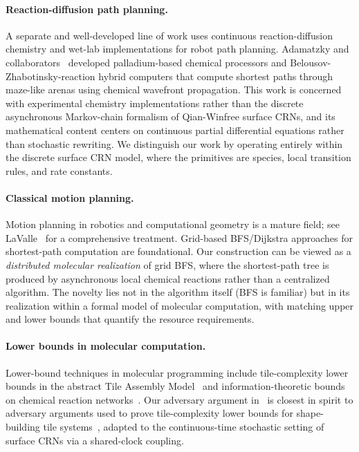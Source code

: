 \documentclass[11pt]{article}
\theoremstyle{plain}
\theoremstyle{definition}
\theoremstyle{remark}
\begin{document}
\paragraph{Reaction-diffusion path planning.} A separate and well-developed line of work uses continuous reaction-diffusion chemistry and wet-lab implementations for robot path planning. Adamatzky and collaborators~\cite{adamatzky2003,adamatzky2005} developed palladium-based chemical processors and Belousov-Zhabotinsky-reaction hybrid computers that compute shortest paths through maze-like arenas using chemical wavefront propagation. This work is concerned with experimental chemistry implementations rather than the discrete asynchronous Markov-chain formalism of Qian-Winfree surface CRNs, and its mathematical content centers on continuous partial differential equations rather than stochastic rewriting. We distinguish our work by operating entirely within the discrete surface CRN model, where the primitives are species, local transition rules, and rate constants.

\paragraph{Classical motion planning.} Motion planning in robotics and computational geometry is a mature field; see LaValle~\cite{lavalle2006} for a comprehensive treatment. Grid-based BFS/Dijkstra approaches for shortest-path computation are foundational. Our construction can be viewed as a \emph{distributed molecular realization} of grid BFS, where the shortest-path tree is produced by asynchronous local chemical reactions rather than a centralized algorithm. The novelty lies not in the algorithm itself (BFS is familiar) but in its realization within a formal model of molecular computation, with matching upper and lower bounds that quantify the resource requirements.

\paragraph{Lower bounds in molecular computation.} Lower-bound techniques in molecular programming include tile-complexity lower bounds in the abstract Tile Assembly Model~\cite{rothemund2000} and information-theoretic bounds on chemical reaction networks~\cite{soloveichik2008}. Our adversary argument in~ is closest in spirit to adversary arguments used to prove tile-complexity lower bounds for shape-building tile systems~\cite{soloveichik2007}, adapted to the continuous-time stochastic setting of surface CRNs via a shared-clock coupling.
\end{document}
